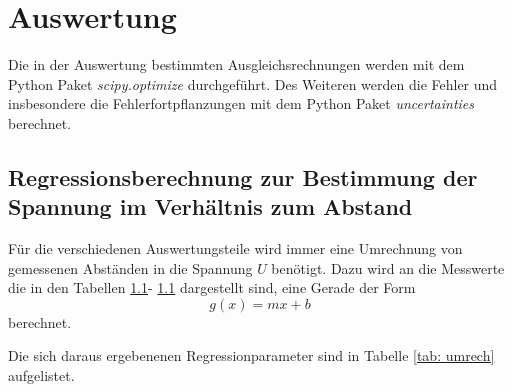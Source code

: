 \section{Auswertung}
Die in der Auswertung bestimmten Ausgleichsrechnungen werden mit
dem Python Paket \emph{scipy.optimize}\cite{scipy} durchgeführt.
Des Weiteren werden die Fehler und insbesondere die Fehlerfortpflanzungen
mit dem Python Paket \emph{uncertainties}\cite{uncertainties} berechnet.

\subsection{Regressionsberechnung zur Bestimmung der Spannung im Verhältnis zum Abstand}

Für die verschiedenen Auswertungsteile wird immer eine Umrechnung von gemessenen Abständen
in die Spannung $U$ benötigt. Dazu wird an die Messwerte die in den Tabellen \ref{}- \ref{} dargestellt sind,
eine Gerade der Form
\begin{equation*}
  g(x)=mx+b
\end{equation*}
berechnet.




Die sich daraus ergebenenen Regressionparameter sind in Tabelle \ref{tab: umrech} aufgelistet.


